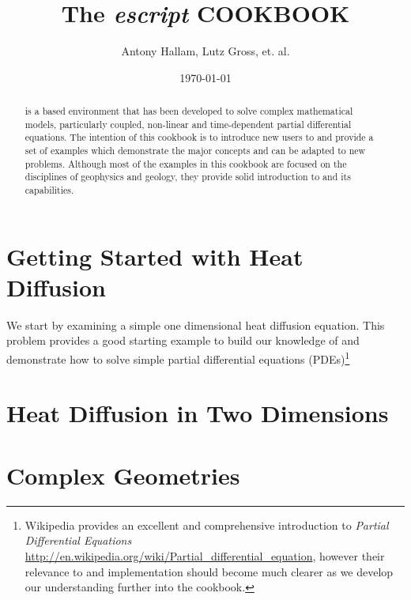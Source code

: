 \documentclass{manual}
\title{The \textit{escript} COOKBOOK}
\author{Antony Hallam, Lutz Gross, et. al.}
\date{\today}
\begin{document}
\maketitle

\ifpdf
{}
\fi



\begin{abstract}
\esc is a \pyt based environment that has been developed to solve complex mathematical models, particularly coupled, non-linear and time-dependent partial differential equations. The intention of this cookbook is to introduce new users to \esc and provide a set of examples which demonstrate the major concepts and can be adapted to new problems. Although most of the examples in this cookbook are focused on the disciplines of geophysics and geology, they provide solid introduction to \esc and its capabilities.
\end{abstract}
\tableofcontents

\newpage




\chapter{Getting Started with Heat Diffusion}
\label{CHAP HEAT DIFF}
We start by examining a simple one dimensional heat diffusion equation. This problem provides a good starting example to build our knowledge of \esc and demonstrate how to solve simple partial differential equations (PDEs)\footnote{Wikipedia provides an excellent and comprehensive introduction to \textit{Partial Differential Equations} \url{http://en.wikipedia.org/wiki/Partial_differential_equation}, however their relevance to \esc and implementation should become much clearer as we develop our understanding further into the cookbook.}



\chapter{Heat Diffusion in Two Dimensions}
\label{CHAP HEAT 2a}



\chapter{Complex Geometries}
\label{CHAP HEAT 2}


% 
\appendix
%
\end{document}
